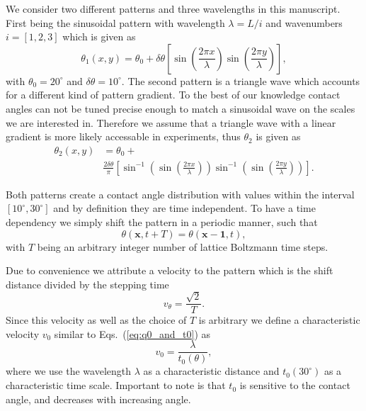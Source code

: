 \documentclass[twocolumn,amsmath,amssymb,showpacs,pre,nofootinbib,superscriptaddress]{revtex4-1} %
\begin{document}
We consider two different patterns and three wavelengths in this manuscript.
First being the sinusoidal pattern with wavelength $\lambda = L/i$ and wavenumbers $i=[1,2,3]$ which is given as
\begin{equation}\label{eq:sinetheta}
    \theta_1(x,y) = \theta_0 + \delta\theta\left[\sin\left(\frac{2\pi x}{\lambda}\right)\sin\left(\frac{2\pi y}{\lambda}\right)\right], 
\end{equation}
with $\theta_0 = 20^{\circ}$ and $\delta\theta=10^{\circ}$.
The second pattern is a triangle wave which accounts for a different kind of pattern gradient.
To the best of our knowledge contact angles can not be tuned precise enough to match a sinusoidal wave on the scales we are interested in.
Therefore we assume that a triangle wave with a linear gradient is more likely accessable in experiments, thus $\theta_2$ is given as
\begin{equation}\label{eq:triangle_wave}
\begin{split}
    \theta_2(x,y) &= \theta_0 + \\ &\frac{2\delta\theta}{\pi}\left[\sin^{-1}\left(\sin\left(\frac{2\pi x}{\lambda}\right)\right)\sin^{-1}\left(\sin\left(\frac{2\pi y}{\lambda}\right)\right)\right].
    \end{split}
\end{equation}

Both patterns create a contact angle distribution with values within the interval $[10^{\circ}, 30^{\circ}]$ and by definition they are time independent.
To have a time dependency we simply shift the pattern in a periodic manner, such that
\begin{equation}\label{eq:theta_shift}
    \theta(\mathbf{x},t+T) = \theta(\mathbf{x}-\mathbf{1}, t), 
\end{equation}
with $T$ being an arbitrary integer number of lattice Boltzmann time steps. 

Due to convenience we attribute a velocity to the pattern which is the shift distance divided by the stepping time
\begin{equation}\label{eq:pattern_speed}
    v_{\theta} = \frac{\sqrt{2}}{T}.
\end{equation}
Since this velocity as well as the choice of $T$ is arbitrary we define a characteristic velocity $v_0$ similar to Eqs.~(\ref{eq:q0_and_t0}) as
\begin{equation}\label{eq:normvel}
    v_0 = \frac{\lambda}{t_0(\theta)},
\end{equation}
where we use the wavelength $\lambda$ as a characteristic distance and $t_0(30^{\circ})$ as a characteristic time scale.
Important to note is that $t_0$ is sensitive to the contact angle, and decreases with increasing angle.
\end{document}
